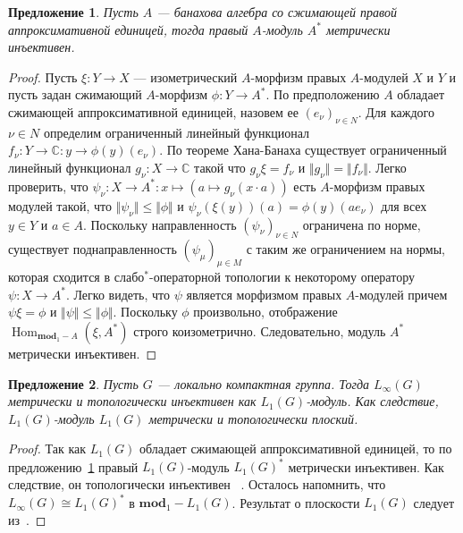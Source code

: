 \documentclass{article}
\numberwithin{equation}{section}
\theoremstyle{plain}
\newtheorem{propos}{Предложение}
\theoremstyle{definition}
\newtheorem{proof}{Доказательство}\def\theproof{}
\newcommand{\isom}{\mathop{\mathbin{\cong}}}
\begin{document}
\begin{fulltext}
\begin{propos}\label{AlgDualWithApproxIdIsMetrInj} Пусть $A$ --- банахова
алгебра со сжимающей правой аппроксимативной единицей, тогда правый $A$-модуль
$A^*$ метрически инъективен. 
\end{propos}
\begin{proof} Пусть $\xi:Y\to X$ --- изометрический $A$-морфизм правых
$A$-модулей $X$ и $Y$ и пусть задан сжимающий $A$-морфизм $\phi: Y\to A^*$. По
предположению $A$ обладает сжимающей аппроксимативной единицей, назовем ее
${(e_\nu)}_{\nu\in N}$. Для каждого $\nu\in N$ определим ограниченный линейный
функционал $f_\nu:Y\to\mathbb{C}:y\to \phi(y)(e_\nu)$. По теореме Хана-Банаха
существует ограниченный линейный функционал $g_\nu:X\to\mathbb{C}$ такой что
$g_\nu\xi=f_\nu$ и $\Vert g_\nu\Vert=\Vert f_\nu\Vert$. Легко проверить, что
$\psi_\nu: X\to A^*:x\mapsto(a\mapsto g_\nu(x\cdot a))$ есть $A$-морфизм правых
модулей такой, что $\Vert\psi_\nu\Vert\leq\Vert\phi\Vert$ и
$\psi_\nu(\xi(y))(a)=\phi(y)(a e_\nu)$ для всех $y\in Y$ и $a\in A$. Поскольку
направленность ${(\psi_\nu)}_{\nu\in N}$ ограничена по норме, существует
поднаправленность ${(\psi_\mu)}_{\mu\in M}$ с таким же ограничением на нормы,
которая сходится в слабо${}^*$-операторной топологии к некоторому оператору
$\psi:X\to A^*$. Легко видеть, что $\psi$ является морфизмом правых $A$-модулей
причем $\psi\xi=\phi$ и $\Vert\psi\Vert\leq\Vert\phi\Vert$. Поскольку $\phi$
произвольно, отображение $\operatorname{Hom}_{\mathbf{mod}_1-A}(\xi, A^*)$
строго коизометрично. Следовательно, модуль $A^*$ метрически инъективен.
\end{proof}

\begin{propos}\label{LInfIsL1MetrInj} Пусть $G$ --- локально компактная группа.
Тогда $L_\infty(G)$ метрически и топологически инъективен как $L_1(G)$-модуль.
Как следствие, $L_1(G)$-модуль $L_1(G)$ метрически и топологически плоский.
\end{propos}
\begin{proof} Так как $L_1(G)$ обладает сжимающей аппроксимативной единицей, то
по предложению~\ref{AlgDualWithApproxIdIsMetrInj} правый $L_1(G)$-модуль
${L_1(G)}^*$ метрически инъективен. Как следствие, он топологически инъективен
~\cite[предложение~2.14]{NemGeomProjInjFlatBanMod}. Осталось напомнить, что
$L_\infty(G)\isom {L_1(G)}^*$ в $\mathbf{mod}_1-L_1(G)$. Результат о плоскости
$L_1(G)$ следует из~\cite[предложение~2.21]{NemGeomProjInjFlatBanMod}.
\end{proof}


\end{fulltext}
\end{document}

